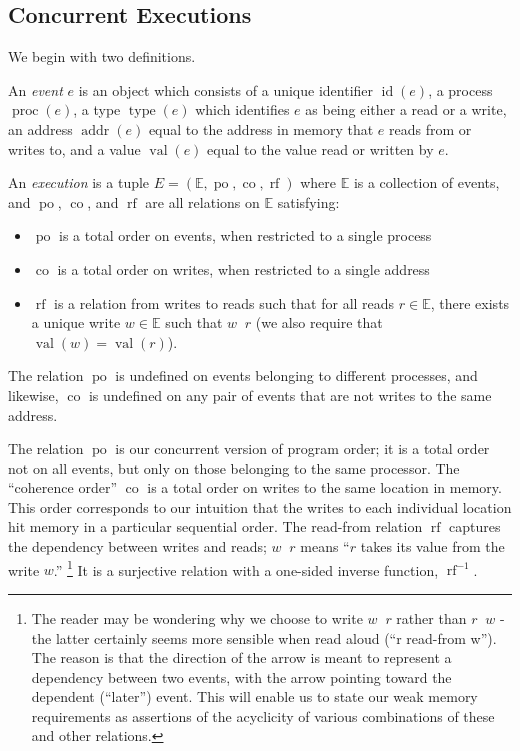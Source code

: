 \documentclass[]{eptcs}
\newenvironment{definition}[1][Definition.]{\begin{trivlist}
\item[\hskip \labelsep {\bfseries #1}]}{\end{trivlist}}
\DeclareMathOperator{\id}{id}
\DeclareMathOperator{\proc}{proc}
\DeclareMathOperator{\type}{type}
\DeclareMathOperator{\addr}{addr}
\DeclareMathOperator{\val}{val}
\DeclareMathOperator{\po}{po}
\DeclareMathOperator{\co}{co}
\DeclareMathOperator{\rf}{rf}
\DeclareMathOperator{\rfto}{\xrightarrow{rf}}
\newcommand{\rfinv}{\rf^{-1}}
\begin{document}
\subsection{Concurrent Executions}

We begin with two definitions.

\begin{definition}
An \emph{event} $e$ is an object which consists of a unique identifier $\id(e)$, a process $\proc(e)$, a type $\type(e)$ which identifies $e$ as being either a read or a write, an address $\addr(e)$ equal to the address in memory that $e$ reads from or writes to, and a value $\val(e)$ equal to the value read or written by $e$.
\end{definition}

\begin{definition}
An \emph{execution} is a tuple $E = (\mathbb{E}, \po, \co, \rf)$ where $\mathbb{E}$ is a collection of events, and $\po$, $\co$, and $\rf$ are all relations on $\mathbb{E}$ satisfying:
\begin{itemize}
  \item $\po$ is a total order on events, when restricted to a single process
  \item $\co$ is a total order on writes, when restricted to a single address
  \item $\rf$ is a relation from writes to reads such that for all reads $r \in \mathbb{E}$, there exists a unique write $w \in \mathbb{E}$ such that $w \rfto r$ (we also require that $\val(w) = \val(r)$).
\end{itemize}
The relation $\po$ is undefined on events belonging to different processes, and likewise, $\co$ is undefined on any pair of events that are not writes to the same address.
\end{definition}

The relation $\po$ is our concurrent version of program order; it is a total order not on all events, but only on those belonging to the same processor. The ``coherence order'' $\co$ is a total order on writes to the same location in memory. This order corresponds to our intuition that the writes to each individual location hit memory in a particular sequential order. The read-from relation $\rf$ captures the dependency between writes and reads; $w \rfto r$ means ``$r$ takes its value from the write $w$.'' \footnote{The reader may be wondering why we choose to write $w \rfto r$ rather than $r \rfto w$ - the latter certainly seems more sensible when read aloud (``r read-from w''). The reason is that the direction of the arrow is meant to represent a dependency between two events, with the arrow pointing toward the dependent (``later'') event. This will enable us to state our weak memory requirements as assertions of the acyclicity of various combinations of these and other relations.} It is a surjective relation with a one-sided inverse function, $\rfinv$.
\end{document}
